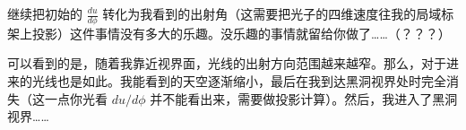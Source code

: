 \documentclass[CJK,13pt]{beamer}
\begin{document}
  \begin{frame}
    继续把初始的 $\frac{du}{d\phi}$ 转化为我看到的出射角（这需要把光子的四维速度往我的局域标架上投影）这件事情没有多大的乐趣。没乐趣的事情就留给你做了……（？？？）

    \skipline
    
    可以看到的是，随着我靠近视界面，光线的出射方向范围越来越窄。那么，对于进来的光线也是如此。我能看到的天空逐渐缩小，最后在我到达黑洞视界处时完全消失（这一点你光看 $du/d\phi$ 并不能看出来，需要做投影计算）。然后，我进入了黑洞视界……

  \end{frame}


  \ech
\end{document}
